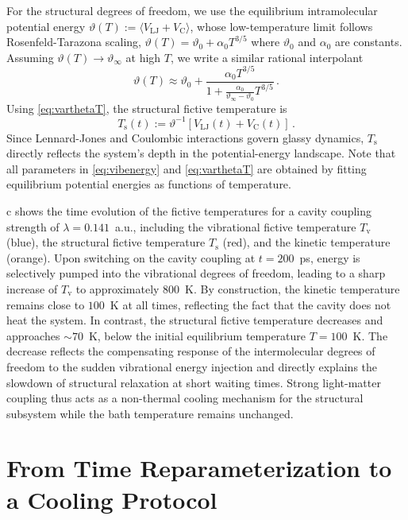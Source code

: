 \documentclass[aps, prl,
 reprint,
 superscriptaddress,
 citeautoscript,
 amsmath,amssymb,
 tightenlines
]{revtex4-2}
\begin{document}
For the structural degrees of freedom, we use the equilibrium intramolecular potential energy $\vartheta(T) :=\langle V_\mathrm{LJ}+V_\mathrm{C}\rangle$, whose low-temperature limit follows Rosenfeld-Tarazona scaling, $\vartheta(T) = \vartheta_0+\alpha_0 T^{3/5}$ where $\vartheta_0$ and $\alpha_0$ are constants. \cite{rosenfeld1998density} 
Assuming $\vartheta(T) \to \vartheta_\infty$ at high $T$, we write a similar rational interpolant 
\begin{equation}
\vartheta(T) \approx \vartheta_0+\frac{\alpha_0 T^{3/5}}{1+\frac{\alpha_0}{\vartheta_\infty-\vartheta_0}T^{3/5}} \,. \label{eq:varthetaT}
\end{equation}
Using \cref{eq:varthetaT},  the structural fictive temperature is
\begin{equation}
T_\mathrm{s}(t) := \vartheta^{-1}[V_\mathrm{LJ}(t)+V_\mathrm{C}(t)] \,. \label{eq:ts}
\end{equation}
Since Lennard-Jones and Coulombic interactions govern glassy dynamics, $T_\mathrm{s}$ directly reflects the system’s depth in the potential-energy landscape. Note that all parameters in \cref{eq:vibenergy} and \cref{eq:varthetaT} are obtained by fitting equilibrium potential energies as functions of temperature.


c shows the time evolution of the fictive temperatures for a cavity coupling strength of $\lambda = 0.141$~a.u., including the vibrational fictive temperature $T_\mathrm{v}$ (blue), the structural fictive temperature $T_\mathrm{s}$ (red), and the kinetic temperature (orange). Upon switching on the cavity coupling at $t = 200$~ps, energy is selectively pumped into the vibrational degrees of freedom, leading to a sharp increase of $T_\mathrm{v}$ to approximately $800$~K. By construction, the kinetic temperature remains close to $100$~K at all times, reflecting the fact that the cavity does not heat the system.  In contrast, the structural fictive temperature decreases and approaches $\sim 70$~K, below the initial equilibrium temperature $T = 100$~K. The decrease reflects the compensating response of the intermolecular degrees of freedom to the sudden vibrational energy injection and directly explains the slowdown of structural relaxation at short waiting times. Strong light-matter coupling thus acts as a non-thermal cooling mechanism for the structural subsystem while the bath temperature remains unchanged.

\section*{From Time Reparameterization to a Cooling Protocol}
\end{document}
